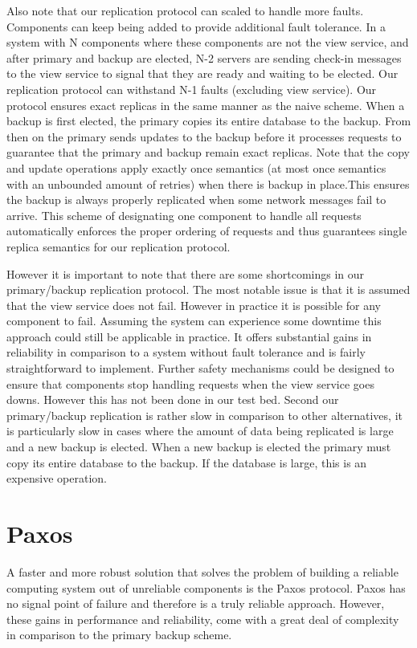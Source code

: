 \documentclass[conference]{IEEEtran}
\begin{document}
Also note that our replication protocol can scaled to handle more faults. Components can keep being added to provide additional fault tolerance. In a system with N components where these components are not the view service, and after primary and backup are elected, N-2 servers are sending check-in messages to the view service to signal that they are ready and waiting to be elected. Our replication protocol can withstand N-1 faults (excluding view service). Our protocol ensures exact replicas in the same manner as the naive scheme. When a backup is first elected, the primary copies its entire database to the backup. From then on the primary sends updates to the backup before it processes requests to guarantee that the primary and backup remain exact replicas. Note that the copy and update operations apply exactly once semantics (at most once semantics with an unbounded amount of retries) when there is  backup in place.This ensures the backup is always properly replicated when some network messages fail to arrive. This scheme of designating one component to handle all requests automatically enforces the proper ordering of requests and thus guarantees single replica semantics for our replication protocol. 

However it is important to note that there are some shortcomings in our primary/backup replication protocol. The most notable issue is that it is assumed that the view service does not fail. However in practice it is possible for any component to fail. Assuming the system can experience some downtime this approach could still be applicable in practice. It offers substantial gains in reliability in comparison to a system without fault tolerance and is fairly straightforward to implement. Further safety mechanisms could be designed to ensure that components stop handling requests when the view service goes downs. However this has not been done in our test bed. Second our primary/backup replication is rather slow in comparison to other alternatives, it is particularly slow in cases where the amount of data being replicated is large and a new backup is elected. When a new backup is elected the primary must copy its entire database to the backup. If the database is large, this is an expensive operation. 

\section{Paxos}
A faster and more robust solution that solves the problem of building a reliable computing system out of unreliable components is the Paxos protocol. Paxos has no signal point of failure and therefore is a truly reliable approach. However, these gains in performance and reliability, come with a great deal of complexity in comparison to the primary backup scheme. 
\end{document}
